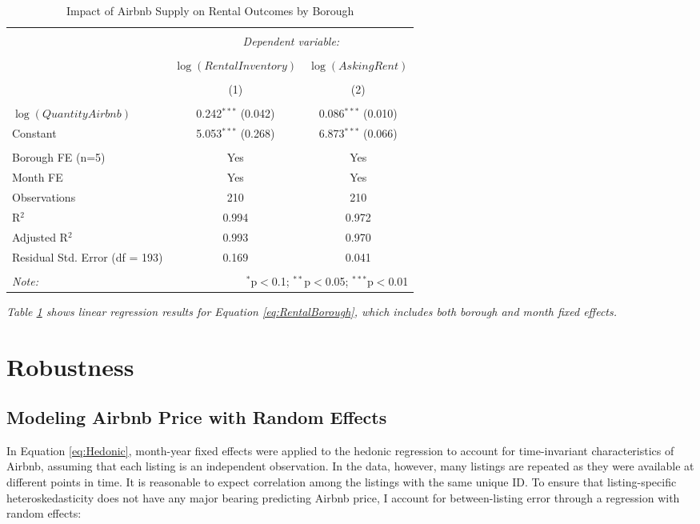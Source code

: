 \documentclass[12pt]{article}
\begin{document}
		\begin{table}[!htbp]   %
			\vspace{.2in}
			\begin{center}
  			\caption{Impact of Airbnb Supply on Rental Outcomes by Borough} 
			\label{tab:RegRentalBorough}
			\begin{tabular}{@{\extracolsep{5pt}}lcc} 
				\\[-1.8ex]\hline 
				\hline \\[-1.8ex] 
				& \multicolumn{2}{c}{\textit{Dependent variable:}} \\ 
				\cline{2-3} 
				\\[-1.8ex] & $\log(RentalInventory)$ & $\log(AskingRent)$ \\ 
				\\[-1.8ex] & (1) & (2)\\ 
				\hline \\[-1.8ex] 
 				$\log(QuantityAirbnb)$ & 0.242$^{***}$ (0.042) & 0.086$^{***}$ (0.010) \\ 
 				Constant & 5.053$^{***}$ (0.268) & 6.873$^{***}$ (0.066) \\ 
				\hline \\[-1.8ex]
				Borough FE (n=5) & Yes & Yes\\
				Month FE & Yes & Yes \\
				Observations & 210 & 210 \\ 
				R$^{2}$ & 0.994 & 0.972 \\ 
				Adjusted R$^{2}$ & 0.993 & 0.970 \\ 
				Residual Std. Error (df = 193) & 0.169 & 0.041 \\ 
				\hline 
				\hline \\[-1.8ex] 
				\textit{Note:}  & \multicolumn{2}{r}{$^{*}$p$<$0.1; $^{**}$p$<$0.05; $^{***}$p$<$0.01} \\ 
			\end{tabular} 
			\end{center}
			\emph{Table \ref{tab:RegRentalBorough} shows linear regression results for Equation \ref{eq:RentalBorough}, which includes both borough and month fixed effects.}
		\end{table} 
		
			
	\section{Robustness}
		\subsection*{Modeling Airbnb Price with Random Effects}
		In Equation \ref{eq:Hedonic}, month-year fixed effects were applied to the hedonic regression to account for time-invariant characteristics of Airbnb, assuming that each listing is an independent observation. In the data, however, many listings are repeated as they were available at different points in time. It is reasonable to expect correlation among the listings with the same unique ID. To ensure that listing-specific heteroskedasticity does not have any major bearing predicting Airbnb price, I account for between-listing error through a regression with random effects:
\end{document}
